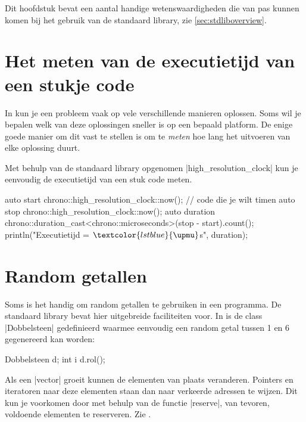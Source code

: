 \begin{cpplstShortInline}
Dit hoofdstuk bevat een aantal handige wetenswaardigheden die van pas kunnen komen bij het gebruik van de \Cpp{} standaard library, zie \cref{sec:stdliboverview}.
\section{Het meten van de executietijd van een stukje code}
In \Cpp{} kun je een probleem vaak op vele verschillende manieren oplossen.
Soms wil je bepalen welk van deze oplossingen sneller is op een bepaald platform.
De enige goede manier om dit vast te stellen is om te \emph{meten} hoe lang het uitvoeren van elke oplossing duurt.

Met behulp van de standaard library opgenomen |high_resolution_clock| kun je eenvoudig de executietijd van een stuk code meten.
\begin{cpplstfragment}[mathescape=true]
	auto start {chrono::high_resolution_clock::now()};
	// code die je wilt timen
	auto stop {chrono::high_resolution_clock::now()};
	auto duration {chrono::duration_cast<chrono::microseconds>(stop - start).count()};
	println("Executietijd = {} $\textcolor{lstblue}{\upmu}$s", duration);
\end{cpplstfragment}

\section{Random getallen}
\label{sec:random}
Soms is het handig om random getallen te gebruiken in een programma.
De \Cpp{} standaard library bevat hier uitgebreide faciliteiten voor.
In  is de class |Dobbelsteen| gedefinieerd waarmee eenvoudig een random getal tussen 1 en 6 gegenereerd kan worden:
\begin{cpplstfragment}
	Dobbelsteen d;
	int i {d.rol()};
\end{cpplstfragment}

Als een |vector| groeit kunnen de elementen van plaats veranderen. 
Pointers en iteratoren naar deze elementen staan dan naar verkeerde adressen te wijzen.
Dit kun je voorkomen door met behulp van de functie |reserve|, van tevoren, voldoende elementen te reserveren.
Zie .


\end{cpplstShortInline}
